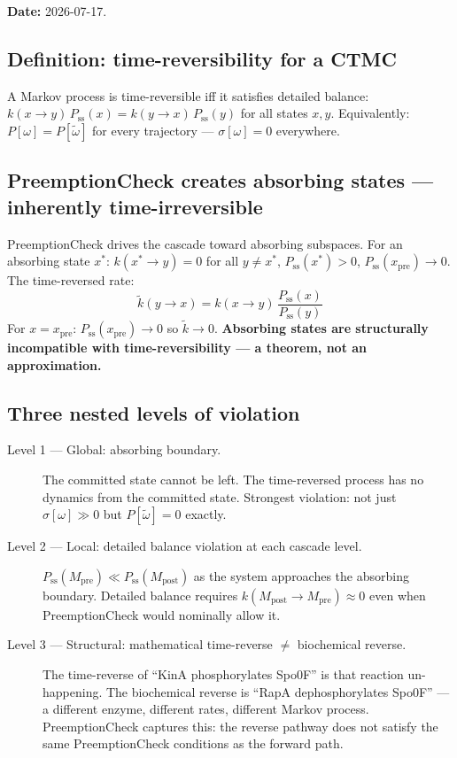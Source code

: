 \documentclass[11pt,a4paper]{article}
\begin{document}
\textbf{Date:} 2026-07-17.

\subsection*{Definition: time-reversibility for a CTMC}

A Markov process is time-reversible iff it satisfies detailed balance:
$k(x \to y)\,P_{\mathrm{ss}}(x) = k(y \to x)\,P_{\mathrm{ss}}(y)$
for all states $x,y$.
Equivalently: $P[\omega] = P[\tilde\omega]$ for every trajectory ---
$\sigma[\omega] = 0$ everywhere.

\subsection*{PreemptionCheck creates absorbing states — inherently time-irreversible}

PreemptionCheck drives the cascade toward absorbing subspaces.
For an absorbing state $x^*$: $k(x^* \to y) = 0$ for all $y \neq x^*$,
$P_{\mathrm{ss}}(x^*) > 0$, $P_{\mathrm{ss}}(x_{\mathrm{pre}}) \to 0$.
The time-reversed rate:
\[
  \tilde k(y \to x) = k(x \to y)\,\frac{P_{\mathrm{ss}}(x)}{P_{\mathrm{ss}}(y)}
\]
For $x = x_{\mathrm{pre}}$: $P_{\mathrm{ss}}(x_{\mathrm{pre}}) \to 0$
so $\tilde k \to 0$.
\textbf{Absorbing states are structurally incompatible with
time-reversibility --- a theorem, not an approximation.}

\subsection*{Three nested levels of violation}

\begin{description}
  \item[Level 1 — Global: absorbing boundary.]
    The committed state cannot be left. The time-reversed process has
    no dynamics from the committed state. Strongest violation:
    not just $\sigma[\omega] \gg 0$ but $P[\tilde\omega] = 0$ exactly.
  \item[Level 2 — Local: detailed balance violation at each cascade level.]
    $P_{\mathrm{ss}}(M_{\mathrm{pre}}) \ll P_{\mathrm{ss}}(M_{\mathrm{post}})$
    as the system approaches the absorbing boundary.
    Detailed balance requires $k(M_{\mathrm{post}} \to M_{\mathrm{pre}})
    \approx 0$ even when PreemptionCheck would nominally allow it.
  \item[Level 3 — Structural: mathematical time-reverse $\neq$ biochemical reverse.]
    The time-reverse of ``KinA phosphorylates Spo0F'' is that reaction
    un-happening. The biochemical reverse is ``RapA dephosphorylates Spo0F''
    --- a different enzyme, different rates, different Markov process.
    PreemptionCheck captures this: the reverse pathway does not satisfy
    the same PreemptionCheck conditions as the forward path.
\end{description}
\end{document}
